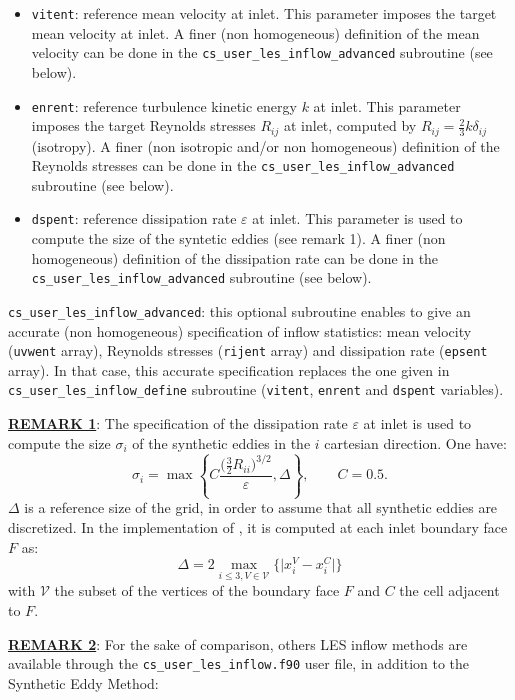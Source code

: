 {{{\begin{itemize}
\item \texttt{vitent}: reference mean velocity at inlet. This
  parameter imposes the target mean velocity at inlet. A finer (non
  homogeneous) definition of the mean velocity can be done in the
  \texttt{cs\_user\_les\_inflow\_advanced} subroutine (see below).

\item \texttt{enrent}: reference turbulence kinetic energy $k$ at
  inlet. This parameter imposes the target Reynolds stresses $R_{ij}$
  at inlet, computed by $R_{ij}=\frac{2}{3}k\delta_{ij}$ (isotropy). A
  finer (non isotropic and/or non homogeneous) definition of the
  Reynolds stresses can be done in the
  \texttt{cs\_user\_les\_inflow\_advanced} subroutine (see below).

\item \texttt{dspent}: reference dissipation rate $\varepsilon$ at
  inlet. This parameter is used to compute the size of the syntetic
  eddies (see remark 1). A finer (non homogeneous) definition of
  the dissipation rate can be done in the
  \texttt{cs\_user\_les\_inflow\_advanced} subroutine (see below).
\end{itemize}

\texttt{cs\_user\_les\_inflow\_advanced}: this optional subroutine
enables to give an accurate (non homogeneous) specification of inflow
statistics: mean velocity (\texttt{uvwent} array), Reynolds stresses
(\texttt{rijent} array) and dissipation rate (\texttt{epsent}
array). In that case, this accurate specification replaces the
one given in \texttt{cs\_user\_les\_inflow\_define} subroutine
(\texttt{vitent}, \texttt{enrent} and \texttt{dspent} variables).

{\bf \underline{REMARK 1}}: The specification of the dissipation rate
$\varepsilon$ at inlet is used to compute the size $\sigma_i$ of the
synthetic eddies in the $i$ cartesian direction. One have:
$$\sigma_i=\max\left\{C\frac{\big(\frac{3}{2}R_{ii}\big)^{3/2}}{\varepsilon},\Delta\right\},\qquad
C=0.5.$$
$\Delta$ is a reference size of the grid, in order to assume that all
synthetic eddies are discretized. In the implementation of \CS, it is
computed at each inlet boundary face $F$ as:
$$\Delta=2\max_{i\le3,V\in\mathcal{V}}\Big\{\big|x_i^V-x_i^C\big|\Big\}$$
with $\mathcal{V}$ the subset of the vertices of the boundary face $F$
and $C$ the cell adjacent to $F$.

{\bf \underline{REMARK 2}}: For the sake of comparison, others LES inflow methods are
available through the 
\texttt{cs\_user\_les\_inflow.f90} user file, in addition to the
Synthetic Eddy Method:

}}}
